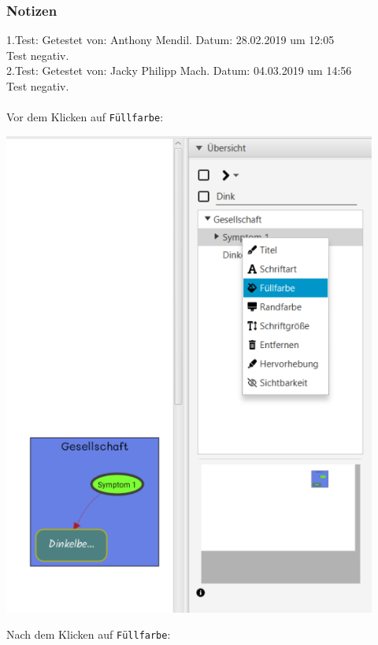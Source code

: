 \documentclass[enabledeprecatedfontcommands]{scrartcl}
\begin{document}
\subsubsection{Notizen}
1.Test: Getestet von: Anthony Mendil. Datum: 28.02.2019 um 12:05 \\
Test negativ.\\
2.Test: Getestet von: Jacky Philipp Mach. Datum: 04.03.2019 um 14:56 \\
Test negativ.\\\\
\newpage
Vor dem Klicken auf \texttt{Füllfarbe}:
\begin{center}
\includegraphics[height=16cm]{farbeSymptomUebersichtVorher.PNG}
\end{center}
\newpage
Nach dem Klicken auf \texttt{Füllfarbe}: 
\end{document}
